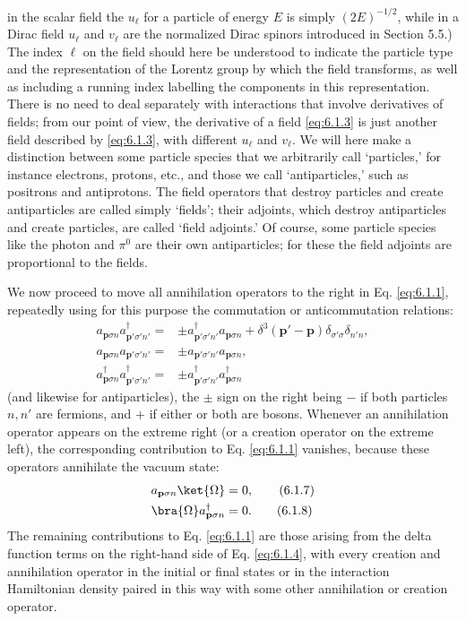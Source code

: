 in the scalar field the $u_\ell$ for a particle of energy $E$ is simply
$(2E)^{-1/2}$, while in a Dirac field $u_\ell$ and $v_\ell$ are the normalized
Dirac spinors introduced in Section 5.5.) The index $\ell$ on the field should
here be understood to indicate the particle type and the representation of the
Lorentz group by which the field transforms, as well as including a running
index labelling the components in this representation. There is no need to
deal separately with interactions that involve derivatives of fields; from
our point of view, the derivative of a field \eqref{eq:6.1.3} is just another field
described by \eqref{eq:6.1.3}, with different $u_\ell$ and $v_\ell$. We will here make a
distinction between some particle species that we arbitrarily call
`particles,' for instance electrons, protons, etc., and those we call
`antiparticles,' such as positrons and antiprotons. The field operators that
destroy particles and create antiparticles are called simply `fields'; their
adjoints, which destroy antiparticles and create particles, are called `field
adjoints.' Of course, some particle species like the photon and $\pi^0$ are
their own antiparticles; for these the field adjoints are proportional to the
fields.

We now proceed to move all annihilation operators to the right in Eq. \eqref{eq:6.1.1},
repeatedly using for this purpose the commutation or anticommutation relations:
\begin{align}
a_{\mathbf p\sigma n}a^\dagger_{\mathbf p'\sigma'n'}
={}&\mathbin{\pm}a^\dagger_{\mathbf p'\sigma'n'}a_{\mathbf p\sigma n}
+\delta^3(\mathbf p'-\mathbf p)\delta_{\sigma'\sigma}\delta_{n'n},
\tag{6.1.4}\label{eq:6.1.4}\\
a_{\mathbf p\sigma n}a_{\mathbf p'\sigma'n'}
={}&\mathbin{\pm}a_{\mathbf p'\sigma'n'}a_{\mathbf p\sigma n},
\tag{6.1.5}\label{eq:6.1.5}\\
a^\dagger_{\mathbf p\sigma n}a^\dagger_{\mathbf p'\sigma'n'}
={}&\mathbin{\pm}a^\dagger_{\mathbf p'\sigma'n'}a^\dagger_{\mathbf p\sigma n}
\tag{6.1.6}
\label{eq:6.1.6}
\end{align}
(and likewise for antiparticles), the $\pm$ sign on the right being $-$ if
both particles $n,n'$ are fermions, and $+$ if either or both are bosons.
Whenever an annihilation operator appears on the extreme right (or a creation
operator on the extreme left), the corresponding contribution to Eq. \eqref{eq:6.1.1}
vanishes, because these operators annihilate the vacuum state:
\begin{align}
a_{\mathbf p\sigma n}\ket{\Omega}&=0,
\tag{6.1.7}\label{eq:6.1.7}\\
\bra{\Omega}a^\dagger_{\mathbf p\sigma n}&=0.
\tag{6.1.8}
\label{eq:6.1.8}
\end{align}
The remaining contributions to Eq. \eqref{eq:6.1.1} are those arising from the delta
function terms on the right-hand side of Eq. \eqref{eq:6.1.4}, with every creation and
annihilation operator in the initial or final states or in the interaction
Hamiltonian density paired in this way with some other annihilation or creation
operator.

